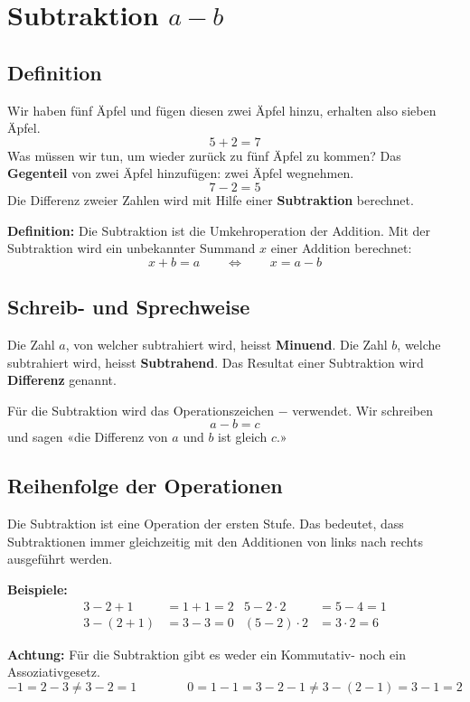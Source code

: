 \newpage
\section{Subtraktion $a-b$}

\subsection{Definition}

Wir haben fünf Äpfel und fügen diesen zwei Äpfel hinzu, erhalten also sieben Äpfel.
\[
  5+2 = 7
\]
Was müssen wir tun, um wieder zurück zu fünf Äpfel zu kommen? Das \textbf{Gegenteil} von zwei Äpfel hinzufügen: zwei Äpfel wegnehmen.
\[
  7-2 = 5
\]
Die Differenz zweier Zahlen wird mit Hilfe einer \textbf{Subtraktion} berechnet.

\textbf{Definition:} Die Subtraktion ist die Umkehroperation der Addition. Mit der Subtraktion wird ein unbekannter Summand $x$ einer Addition berechnet:
\[
  x+b = a \qquad\Leftrightarrow\qquad x = a-b
\]

\subsection{Schreib- und Sprechweise}

Die Zahl $a$, von welcher subtrahiert wird, heisst \textbf{Minuend}. Die Zahl $b$, welche subtrahiert wird, heisst \textbf{Subtrahend}. Das Resultat einer Subtraktion wird \textbf{Differenz} genannt.

Für die Subtraktion wird das Operationszeichen $-$ verwendet. Wir schreiben
\[
  a - b = c
\]
und sagen «die Differenz von $a$ und $b$ ist gleich $c$.»

\subsection{Reihenfolge der Operationen}

Die Subtraktion ist eine Operation der ersten Stufe. Das bedeutet, dass Subtraktionen immer gleichzeitig mit den Additionen von links nach rechts ausgeführt werden.
\begin{example}
  \textbf{Beispiele:}
  \begin{align*}
      3-2+1 &= 1+1 = 2 &   5-2\cdot 2 &= 5-4 = 1 \\
    3-(2+1) &= 3-3 = 0 & (5-2)\cdot 2 &= 3\cdot 2 = 6
  \end{align*}
\end{example}
\begin{note}
  \textbf{Achtung:} Für die Subtraktion gibt es weder ein Kommutativ- noch ein Assoziativgesetz.
  \[
    -1 = 2-3 \ne 3-2 = 1 \qquad\qquad 0 = 1-1 = 3-2-1 \ne 3-(2-1) = 3-1 = 2
  \]
\end{note}
